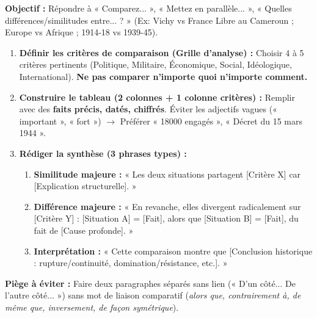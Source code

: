 \documentclass[11pt]{article}
\begin{document}
\begin{methode}
\textbf{Objectif :} Répondre à « Comparez... », « Mettez en parallèle... », « Quelles différences/similitudes entre... ? » (Ex: Vichy vs France Libre au Cameroun ; Europe vs Afrique ; 1914-18 vs 1939-45).
\begin{enumerate}
    \item \textbf{Définir les critères de comparaison (Grille d'analyse) :} Choisir 4 à 5 critères pertinents (Politique, Militaire, Économique, Social, Idéologique, International). \textbf{Ne pas comparer n'importe quoi n'importe comment.}
    \item \textbf{Construire le tableau (2 colonnes + 1 colonne critères) :} Remplir avec des \textbf{faits précis, datés, chiffrés}. Éviter les adjectifs vagues (« important », « fort ») $\rightarrow$ Préférer « \num{18000} engagés », « Décret du 15 mars 1944 ».
    \item \textbf{Rédiger la synthèse (3 phrases types) :}
    \begin{enumerate}
        \item \textbf{Similitude majeure :} « Les deux situations partagent [Critère X] car [Explication structurelle]. »
        \item \textbf{Différence majeure :} « En revanche, elles divergent radicalement sur [Critère Y] : [Situation A] = [Fait], alors que [Situation B] = [Fait], du fait de [Cause profonde]. »
        \item \textbf{Interprétation :} « Cette comparaison montre que [Conclusion historique : rupture/continuité, domination/résistance, etc.]. »
    \end{enumerate}
\end{enumerate}
\textbf{Piège à éviter :} Faire deux paragraphes séparés sans lien (« D'un côté... De l'autre côté... ») sans mot de liaison comparatif (\textit{alors que, contrairement à, de même que, inversement, de façon symétrique}).
\end{methode}
\end{document}
